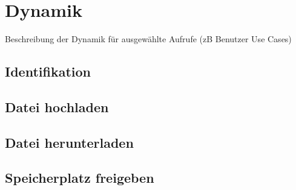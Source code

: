 \section{Dynamik}
Beschreibung der Dynamik für ausgewählte Aufrufe (zB Benutzer Use Cases)
\subsection{Identifikation}

\subsection{Datei hochladen}

\subsection{Datei herunterladen}

\subsection{Speicherplatz freigeben}
